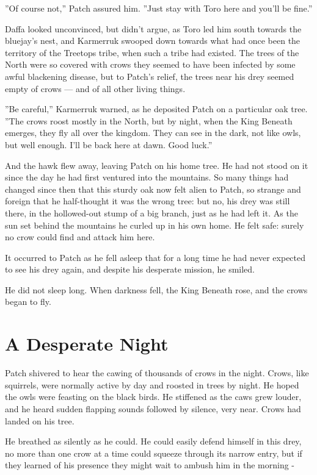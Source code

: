 \documentclass[12pt]{book}
\begin{document}
''Of course not,'' Patch assured him. ''Just stay with Toro here and you'll be fine.''

Daffa looked unconvinced, but didn't argue, as Toro led him south towards the bluejay's nest, and Karmerruk swooped down towards what had once been the territory of the Treetops tribe, when such a tribe had existed. The trees of the North were so covered with crows they seemed to have been infected by some awful blackening disease, but to Patch's relief, the trees near his drey seemed empty of crows ---
and of all other living things.

''Be careful,'' Karmerruk warned, as he deposited Patch on a particular oak tree. ''The crows roost mostly in the North, but by night, when the King Beneath emerges, they fly all over the kingdom. They can see in the dark, not like owls, but well enough. I'll be back here at dawn. Good luck.''

And the hawk flew away, leaving Patch on his home tree. He had not stood on it since the day he had first ventured into the mountains. So many things had changed since then that this sturdy oak now felt alien to Patch, so strange and foreign that he half-thought it was the wrong tree: but no, his drey was still there, in the hollowed-out stump of a big branch, just as he had left it. As the sun set behind the mountains he curled up in his own home. He felt safe: surely no crow could find and attack him here.

It occurred to Patch as he fell asleep that for a long time he had never expected to see his drey again, and despite his desperate mission, he smiled.

He did not sleep long. When darkness fell, the King Beneath rose, and the crows began to fly.


\section{A Desperate Night}

Patch shivered to hear the cawing of thousands of crows in the night. Crows, like squirrels, were normally active by day and roosted in trees by night. He hoped the owls were feasting on the black birds. He stiffened as the caws grew louder, and he heard sudden flapping sounds followed by silence, very near. Crows had landed on his tree.

He breathed as silently as he could. He could easily defend himself in this drey, no more than one crow at a time could squeeze through its narrow entry, but if they learned of his presence they might wait to ambush him in the morning -
\end{document}
